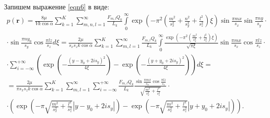 \documentclass[a4paper,12pt]{article}
\begin{document}
	Запишем выражение \eqref{eqn6} в виде:
\begin{multline}
	\label{eqn9}
	p(\boldsymbol{r}) = \frac{8\mu}{Vk\cos\alpha}\sum\limits_{k=1}^K \sum\limits_{m, n, l = 1}^{\infty} \frac{F_{m, l}Q_k}{L_k} \int\limits_0^{\infty}\exp\left(-\pi^2\left(\frac{m^2}{s_x^2} + \frac{n^2}{s_y^2} + \frac{l^2}{s_z^2}\right)\xi\right)\sin\frac{\pi m x}{s_x}\sin\frac{\pi n y}{s_y} \cdot\\
	\cdot\sin\frac{\pi n y_0}{s_y}\cos\frac{\pi l z}{s_z}d\xi = 
	\frac{2\mu}{s_x s_z k \cos\alpha}\sum\limits_{k=1}^K \sum\limits_{m, l = 1}^{\infty} \frac{F_{m, l}Q_k}{L_k} \int\limits_0^{\infty}\frac{\exp\left(-\pi^2\left(\frac{m^2}{s_x^2} + \frac{l^2}{s_z^2}\right)\xi\right)}{\sqrt{\pi \xi}}\sin\frac{\pi m x}{s_x}\cos\frac{\pi l z}{s_z}\cdot\\
	\cdot\sum\limits_{i=-\infty}^{+\infty}\left(\exp\left(-\frac{(y-y_0 + 2is_y)^2}{4\xi}\right) - \exp\left(-\frac{(y+y_0 + 2is_y)^2}{4\xi}\right)\right)d\xi=\\
	= \frac{2\mu}{\pi s_x s_z k \cos\alpha}\sum\limits_{k=1}^K \sum\limits_{m, l = 1}^{\infty}\sum\limits_{i = -\infty}^{+\infty}\frac{F_{m, l}Q_k}{L_k}
	\frac{\sin\displaystyle\frac{\pi m x}{s_x}\cos\displaystyle\frac{\pi l z}{s_z}}{\sqrt{\displaystyle\frac{m^2}{s_x^2}+\displaystyle\frac{l^2}{s_z^2}}}\cdot\\
	\cdot\left(\exp\left(-\pi \sqrt{\frac{m^2}{s_x^2} + \frac{l^2}{s_z^2}}\left|y-y_0+2is_y\right|\right)-\exp\left(-\pi \sqrt{\frac{m^2}{s_x^2} + \frac{l^2}{s_z^2}}\left|y+y_0+2is_y\right|\right)\right).
\end{multline}
	
\end{document}
